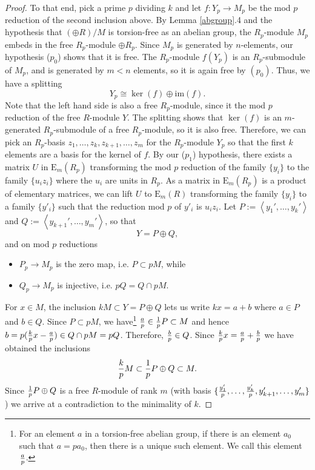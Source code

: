 \documentclass[11pt,letterpaper]{amsart}
\begin{document}
\begin{proof}
To that end, pick a prime $p$ dividing $k$ and let $f:Y_p\rightarrow M_p$ be the mod $p$ reduction of the second inclusion above. By Lemma \ref{abgroup}.4 and the hypothesis that $(\oplus R)/M$ is torsion-free as an abelian group, the $R_p$-module $M_p$ embeds in the free $R_p$-module $\oplus R_p$. Since $M_p$ is generated by $n$-elements, our hypothesis ($p_0$) shows that it is free. The $R_p$-module $f (Y_p)$ is an $R_p$-submodule of $M_p$, and is generated by $m<n$ elements, so it is again free by $(p_0)$. Thus, we have a splitting
$$
Y_p \cong\ker(f) \oplus\mathrm{im} (f) .
$$
Note that the left hand side is also a free $R_p$-module, since it the mod $p$ reduction of the free $R$-module $Y$. The splitting shows that $\ker (f)$ is an $m$-generated $R_p$-submodule of a free $R_p$-module, so it is also free. Therefore, we can pick an $R_p$-basis $z_1,\dots,z_k,z_{k+1},\dots,z_m$ for the $R_p$-module $Y_p$ so that the first $k$ elements are a basis for the kernel of $f$. %
By our ($p_1$) hypothesis, there exists a matrix $U$ in $\mathrm{E}_m  (R_p)$ transforming the mod $p$ reduction of the family $\{y_i\}$ to the family $\{u_i z_i\}$ where the $u_i$ are units in $R_p$. As a matrix in $\mathrm{E}_m (R_p)$ is a product of elementary matrices, we can lift $U$ to $\mathrm{E}_m  (R)$ transforming the family $\{y_i\}$ to a family $\{y'_i\}$ such that the reduction mod $p$ of $y'_i$ is $u_i z_i$. Let $P:=\left<y_1',\dots,y_k'\right>$ and $Q:=\left<y_{k+1}',\dots,y_m'\right>$, so that 
$$
Y=P\oplus Q,
$$
and on mod $p$ reductions
\begin{itemize}
\item
$P_p\rightarrow M_p$ is the zero map, i.e. $P\subset pM$, while
\item
$Q_p\rightarrow M_p$ is injective, i.e. $pQ=Q\cap pM$.
\end{itemize}
For $x\in M$, the inclusion $kM\subset Y=P\oplus Q$ lets us write $kx=a+b$ where $a\in P$ and $b\in Q$. Since $P\subset pM$, we have\footnote{For an element $a$ in a torsion-free abelian group, if there is an element $a_0$ such that $a=pa_0$, then there is a unique such element. We call this element ${a\over p}$.} ${a\over p}\in {1\over p}P\subset M$ and hence $b=p({k\over p}x-{a\over p})\in Q\cap pM=pQ$. Therefore, ${b\over p}\in Q$. Since ${k\over p}x={a\over p}+{b\over p}$ we have obtained the inclusions
$$
{k\over p}M\subset {1\over p}P\oplus Q\subset M.
$$
Since ${1\over p}P\oplus Q$ is a free $R$-module of rank $m$ (with basis $\{{y_1'\over p},\dots,{y_k'\over p},y'_{k+1},\dots,y_m'\}$) we arrive at a contradiction to the minimality of $k$.
\end{proof}
\end{document}
